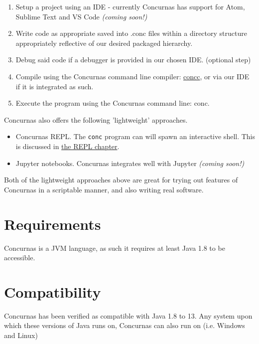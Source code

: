 \documentclass[conc-doc]{subfiles}
\begin{document}
\begin{enumerate}
	\item Setup a project using an IDE - currently Concurnas has support for Atom, Sublime Text and VS Code  \textit{(coming soon!)}
	\item Write code as appropriate saved into .conc files within a directory structure appropriately reflective of our desired packaged hierarchy.
	\item Debug said code if a debugger is provided in our chosen IDE. (optional step)
	\item Compile using the Concurnas command line compiler: \hyperref[ch:concc]{concc}, or via our IDE if it is integrated as such.
	\item Execute the program using the Concurnas command line: conc.
\end{enumerate}

Concurnas also offers the following 'lightweight' approaches.

\begin{itemize}
	\item Concurnas REPL. The \lstinline{conc} program can will spawn an interactive shell. This is discussed in \hyperref[ch:repl]{the REPL chapter}.
	\item Jupyter notebooks. Concurnas integrates well with Jupyter\textit{ (coming soon!)}
\end{itemize}

Both of the lightweight approaches above are great for trying out features of Concurnas in a scriptable manner, and also writing real software.


\section{Requirements}
Concurnas is a JVM language, as such it requires at least Java 1.8 to be accessible.

\section{Compatibility}
Concurnas has been verified as compatible with Java 1.8 to 13. Any system upon which these versions of Java runs on,  Concurnas can also run on (i.e. Windows and Linux)
\end{document}
